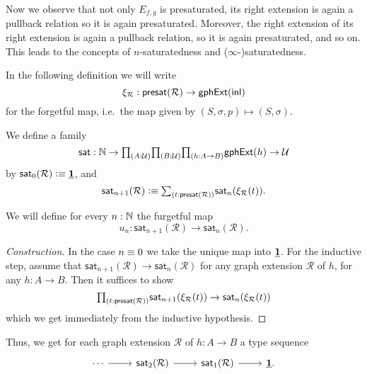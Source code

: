 Now we observe that not only $E_{f,g}$ is presaturated, its right extension is again a pullback relation so it is again presaturated. Moreover, the right extension of its right extension is again a pullback relation, so it is again presaturated, and so on. This leads to the concepts of $n$-saturatedness and ($\infty$-)saturatedness.

In the following definition we will write 
\begin{equation*}
\xi_{\mathcal{R}}: \mathsf{presat}(\mathcal{R})\to \mathsf{gphExt}({\mathsf{inl}})
\end{equation*}
for the forgetful map, i.e.~the map given by $(S,\sigma,p)\mapsto (S,\sigma)$.

\begin{defn}
We define a family
\begin{equation*}
\mathsf{sat} : \N\to \prd{A:\UU}{B:\UU}{h:A\to B} \mathsf{gphExt}(h)\to \UU
\end{equation*}
by $\mathsf{sat}_0(\mathcal{R})\vcentcolon\equiv \underline{\mathbf{1}}$, and 
\begin{equation*}
\mathsf{sat}_{n+1}(\mathcal{R})\defeq \sm{t:\mathsf{presat}(\mathcal{R})} \mathsf{sat}_n(\xi_{\mathcal{R}}(t)).
\end{equation*}
\end{defn}

\begin{defn}
We will define for every $n:\mathbb{N}$ the furgetful map
\begin{equation*}
u_n:\mathsf{sat}_{n+1}(\mathcal{R})\to \mathsf{sat}_{n}(\mathcal{R}).
\end{equation*}
\end{defn}

\begin{proof}[Construction]
In the case $n\equiv 0$ we take the unique map into $\underline{\mathbf{1}}$.
For the inductive step, assume that $\mathsf{sat}_{n+1}(\mathcal{R})\to \mathsf{sat}_{n}(\mathcal{R})$ for any graph extension $\mathcal{R}$ of $h$, for any $h:A\to B$. 
Then it suffices to show
\begin{equation*}
\prd{t:\mathsf{presat}(\mathcal{R})} \mathsf{sat}_{n+1}(\xi_{\mathcal{R}}(t))\to \mathsf{sat}_{n}(\xi_{\mathcal{R}}(t))
\end{equation*}
which we get immediately from the inductive hypothesis.
\end{proof}

Thus, we get for each graph extension $\mathcal{R}$ of $h:A\to B$ a type sequence
\begin{equation}\label{eq:sat}
\begin{tikzcd}
\cdots \arrow[r] & \mathsf{sat}_{2}(\mathcal{R}) \arrow[r] & \mathsf{sat}_1(\mathcal{R}) \arrow[r] & \unit.
\end{tikzcd}
\end{equation}

